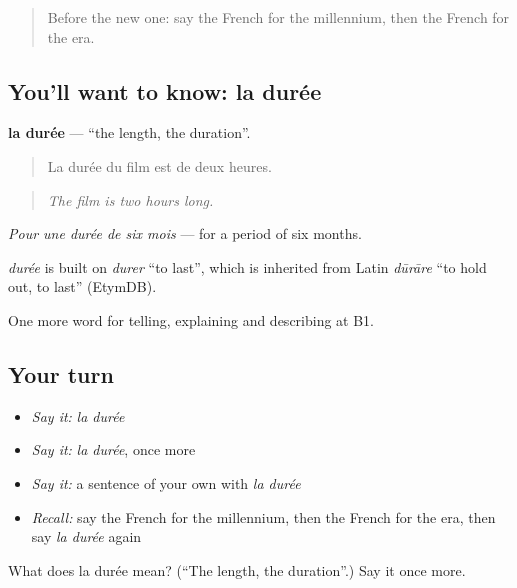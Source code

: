 \label{lesson:FR-C276-duree}



\begin{quote}
Before the new one: say the French for the millennium, then the French for the era.
\end{quote}

\subsection*{You'll want to know: la durée}
\textbf{la durée} — \textquotedblleft{}the length, the duration\textquotedblright{}.

\begin{quote}
La durée du film est de deux heures.
\end{quote}

\begin{quote}
\emph{The film is two hours long.}
\end{quote}

\emph{Pour une durée de six mois} — for a period of six months.

\begin{cousinweb}
\emph{durée} is built on \emph{durer} \textquotedblleft{}to last\textquotedblright{}, which is inherited from Latin \emph{dūrāre} \textquotedblleft{}to hold out, to last\textquotedblright{} (EtymDB).
\end{cousinweb}

\begin{grammarlens}[title={What you've built}]
One more word for telling, explaining and describing at B1.
\end{grammarlens}

\subsection*{Your turn}
\begin{itemize}
\raggedright
  \item \emph{Say it:} \emph{la durée}
  \item \emph{Say it:} \emph{la durée}, once more
  \item \emph{Say it:} a sentence of your own with \emph{la durée}
  \item \emph{Recall:} say the French for the millennium, then the French for the era, then say \emph{la durée} again
\end{itemize}

\begin{tcolorbox}[breakable,colback=teal!4,colframe=teal!35!black,title={Before you move on}]
What does la durée mean? (\textquotedblleft{}The length, the duration\textquotedblright{}.) Say it once more.
\end{tcolorbox}
